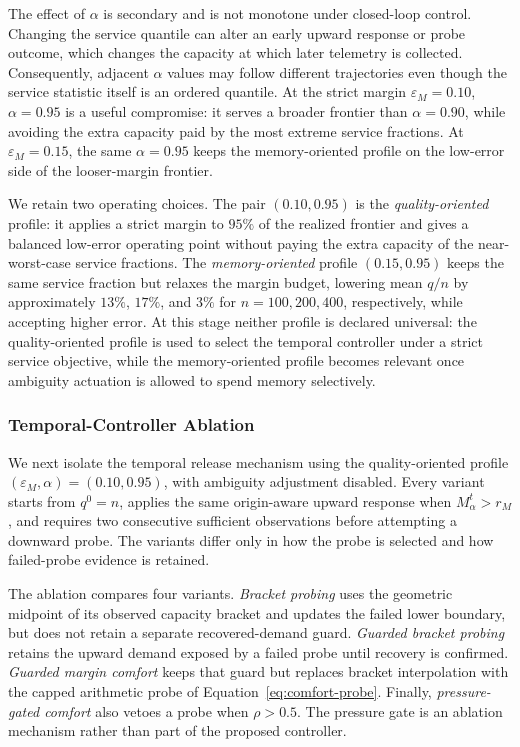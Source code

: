 \documentclass[sigconf, nonacm]{acmart}
\begin{document}
The effect of \(\alpha\) is secondary and is not monotone under closed-loop control. Changing the service quantile can alter an early upward response or probe outcome, which changes the capacity at which later telemetry is collected. Consequently, adjacent \(\alpha\) values may follow different trajectories even though the service statistic itself is an ordered quantile. At the strict margin \(\varepsilon_M=0.10\), \(\alpha=0.95\) is a useful compromise: it serves a broader frontier than \(\alpha=0.90\), while avoiding the extra capacity paid by the most extreme service fractions. At \(\varepsilon_M=0.15\), the same \(\alpha=0.95\) keeps the memory-oriented profile on the low-error side of the looser-margin frontier.

We retain two operating choices. The pair \((0.10,0.95)\) is the
\emph{quality-oriented} profile: it applies a strict margin to \(95\%\) of the
realized frontier and gives a balanced low-error operating point without paying
the extra capacity of the near-worst-case service fractions. The
\emph{memory-oriented} profile \((0.15,0.95)\) keeps the same service fraction
but relaxes the margin budget, lowering mean \(q/n\) by approximately \(13\%\),
\(17\%\), and \(3\%\) for \(n=100,200,400\), respectively, while accepting
higher error. At this stage neither profile is declared universal: the
quality-oriented profile is used to select the temporal controller under a
strict service objective, while the memory-oriented profile becomes relevant
once ambiguity actuation is allowed to spend memory selectively.



\subsubsection{Temporal-Controller Ablation}
\label{subsubsec:temporal-ablation}
We next isolate the temporal release mechanism using the quality-oriented
profile \((\varepsilon_M,\alpha)=(0.10,0.95)\), with
ambiguity adjustment disabled. Every variant starts from \(q^0=n\), applies the
same origin-aware upward response when \(M_\alpha^t>r_M\), and requires two
consecutive sufficient observations before attempting a downward probe. The
variants differ only in how the probe is selected and how failed-probe evidence
is retained.



The ablation compares four variants. \emph{Bracket probing} uses the geometric
midpoint of its observed capacity bracket and updates the failed lower
boundary, but does not retain a separate recovered-demand guard. \emph{Guarded
bracket probing} retains the upward demand exposed by a failed probe until
recovery is confirmed. \emph{Guarded margin comfort} keeps that guard but
replaces bracket interpolation with the capped arithmetic probe of
Equation~\eqref{eq:comfort-probe}. Finally, \emph{pressure-gated comfort}
also vetoes a probe when \(\rho>0.5\). The pressure gate is an ablation
mechanism rather than part of the proposed controller.
\end{document}
